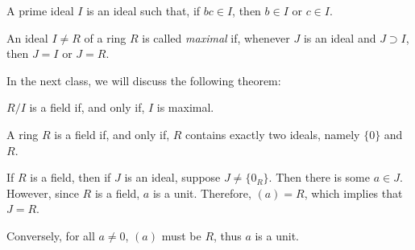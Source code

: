 \begin{defn}
	A prime ideal $I$ is an ideal such that, if $bc \in I$, then $b \in I$ or $c \in I$.
\end{defn}

\begin{defn}
	An ideal $I \neq R$ of a ring $R$ is called \emph{maximal} if, whenever $J$ is an ideal and $J \supset I$, then $J = I$ or $J = R$.
\end{defn}

In the next class, we will discuss the following theorem:
\begin{thm}
	$R / I$ is a field if, and only if,  $I$ is maximal.
\end{thm}

\begin{lem}
	A ring $R$ is a field if, and only if, $R$ contains exactly two ideals, namely $\{0\}$ and $R$.
\end{lem}
\begin{dem}
	If $R$ is a field, then if $J$ is an ideal, suppose $J \neq \{0_R\}$. Then there is some $a \in J$. However, since $R$ is a field, $a$ is a unit. Therefore, $(a) = R$, which implies that $J = R$.

	Conversely, for all $a \neq 0$, $(a)$ must be $R$, thus $a$ is a unit.
\end{dem}
